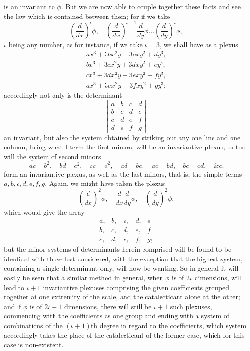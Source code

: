 \documentclass[11pt]{article}
\newcommand{\sourcepage}[1]{\marginpar{\scriptsize p.~#1}}
\begin{document}
\sourcepage{347}
is an invariant to $\phi$. But we are now able to couple together these facts and see the law which is contained between them; for if we take
\[
\left(\frac{d}{dx}\right)^\iota\phi,\quad
\left(\frac{d}{dx}\right)^{\iota-1}\frac{d}{dy}\phi\ldots
\left(\frac{d}{dy}\right)^\iota\phi,
\]
$\iota$ being any number, as for instance, if we take $\iota=3$, we shall have as a plexus
\[
\begin{array}{l}
ax^3+3bx^2y+3cxy^2+dy^3,\\
bx^3+3cx^2y+3dxy^2+ey^3,\\
cx^3+3dx^2y+3exy^2+fy^3,\\
dx^3+3ex^2y+3fxy^2+gy^3;
\end{array}
\]
accordingly not only is the determinant
\[
\left|\begin{array}{cccc}
a&b&c&d\\
b&c&d&e\\
c&d&e&f\\
d&e&f&g
\end{array}\right|
\]
an invariant, but also the system obtained by striking out any one line and one column, being what I term the first minors, will be an invariantive plexus, so too will the system of second minors
\[
ac-b^2,\quad bd-c^2,\quad ce-d^2,\quad
ad-bc,\quad ae-bd,\quad be-cd,\quad \&c.
\]
form an invariantive plexus, as well as the last minors, that is, the simple terms $a,b,c,d,e,f,g$. Again, we might have taken the plexus
\[
\left(\frac{d}{dx}\right)^2\phi,\quad
\frac{d}{dx}\frac{d}{dy}\phi,\quad
\left(\frac{d}{dy}\right)^2\phi,
\]
which would give the array
\[
\begin{array}{ccccc}
a,&b,&c,&d,&e\\
b,&c,&d,&e,&f\\
c,&d,&e,&f,&g;
\end{array}
\]
but the minor systems of determinants herein comprised will be found to be identical with those last considered, with the exception that the highest system, containing a single determinant only, will now be wanting. So in general it will easily be seen that a similar method in general, when $\phi$ is of $2\iota$ dimensions, will lead to $\iota+1$ invariantive plexuses comprising the given coefficients grouped together at one extremity of the scale, and the catalecticant alone at the other; and if $\phi$ is of $2\iota+1$ dimensions, there will still be $\iota+1$ such plexuses, commencing with the coefficients as one group and ending with a system of combinations of the $(\iota+1)$th degree in regard to the coefficients, which system accordingly takes the place of the catalecticant of the former case, which for this case is non-existent.
\end{document}
